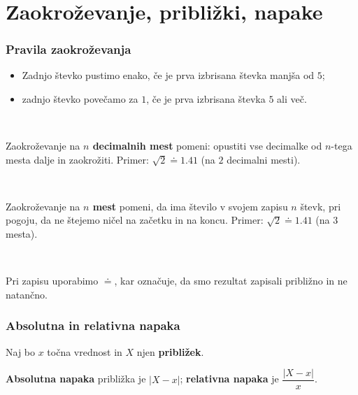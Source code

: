     ~~~\\






    \newpage
\section{Zaokroževanje, približki, napake}

    
        \subsubsection*{Pravila zaokroževanja}
            \begin{itemize}
                \item Zadnjo števko pustimo enako, če je prva izbrisana števka manjša od $5$;
                \item zadnjo števko povečamo za $1$, če je prva izbrisana števka $5$ ali več.
            \end{itemize}
        

            ~~

        
            Zaokroževanje na \textbf{$n$ decimalnih mest} pomeni: 
            opustiti vse decimalke od $n$-tega mesta dalje in zaokrožiti.
            Primer: $\sqrt{2}\doteq 1.41$ (na $2$ decimalni mesti).
        
            ~~
        
            Zaokroževanje na \textbf{$n$ mest} pomeni, 
            da ima število v svojem zapisu $n$ števk, 
            pri pogoju, da ne štejemo ničel na začetku in na koncu.
            Primer: $\sqrt{2}\doteq 1.41$ (na $3$ mesta).
        
            ~
        
            Pri zapisu uporabimo $\doteq$, kar označuje, da smo rezultat zapisali približno in ne natančno.
        

    

    
        \subsubsection*{Absolutna in relativna napaka}
            Naj bo $x$ točna vrednost in $X$ njen \textbf{približek}.

            \textbf{Absolutna napaka} približka je $\left\lvert X-x\right\rvert$; 
            \textbf{relativna napaka} je $\dfrac{\left\lvert X-x\right\rvert}{x}$.
        
